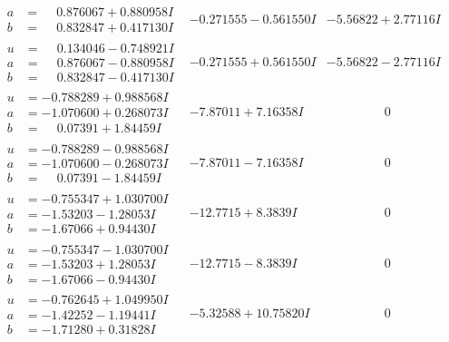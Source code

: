 \documentclass[1p]{elsarticle_modified}
\theoremstyle{definition}
\begin{document}
$$\begin{array}{c|c|c}
\begin{aligned}
a &= \phantom{-}0.876067 + 0.880958 I \\
b &= \phantom{-}0.832847 + 0.417130 I\end{aligned}
 & -0.271555 - 0.561550 I & -5.56822 + 2.77116 I \\ \hline\begin{aligned}
u &= \phantom{-}0.134046 - 0.748921 I \\
a &= \phantom{-}0.876067 - 0.880958 I \\
b &= \phantom{-}0.832847 - 0.417130 I\end{aligned}
 & -0.271555 + 0.561550 I & -5.56822 - 2.77116 I \\ \hline\begin{aligned}
u &= -0.788289 + 0.988568 I \\
a &= -1.070600 + 0.268073 I \\
b &= \phantom{-}0.07391 + 1.84459 I\end{aligned}
 & -7.87011 + 7.16358 I & \phantom{-0.000000 } 0 \\ \hline\begin{aligned}
u &= -0.788289 - 0.988568 I \\
a &= -1.070600 - 0.268073 I \\
b &= \phantom{-}0.07391 - 1.84459 I\end{aligned}
 & -7.87011 - 7.16358 I & \phantom{-0.000000 } 0 \\ \hline\begin{aligned}
u &= -0.755347 + 1.030700 I \\
a &= -1.53203 - 1.28053 I \\
b &= -1.67066 + 0.94430 I\end{aligned}
 & -12.7715 + 8.3839 I & \phantom{-0.000000 } 0 \\ \hline\begin{aligned}
u &= -0.755347 - 1.030700 I \\
a &= -1.53203 + 1.28053 I \\
b &= -1.67066 - 0.94430 I\end{aligned}
 & -12.7715 - 8.3839 I & \phantom{-0.000000 } 0 \\ \hline\begin{aligned}
u &= -0.762645 + 1.049950 I \\
a &= -1.42252 - 1.19441 I \\
b &= -1.71280 + 0.31828 I\end{aligned}
 & -5.32588 + 10.75820 I & \phantom{-0.000000 } 0 \\ \hline\begin{aligned}

\end{aligned}
\end{array}$$
\end{document}
